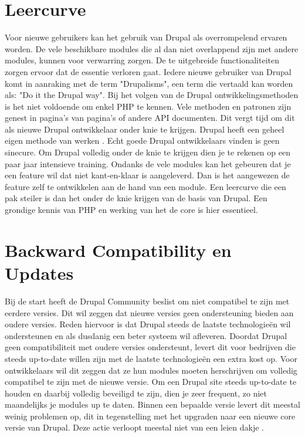 \label{ch:probleemstelling bij Drupal}

\section{Leercurve}
Voor nieuwe gebruikers kan het gebruik van Drupal als overrompelend ervaren worden. De vele beschikbare modules die al dan niet overlappend zijn met andere modules, kunnen voor verwarring zorgen. De te uitgebreide functionaliteiten zorgen ervoor dat de essentie verloren gaat. 
\newline\newline
Iedere nieuwe gebruiker van Drupal komt in aanraking met de term "Drupalisms", een term die vertaald kan worden als: "Do it the Drupal way". Bij het volgen van de Drupal ontwikkelingsmethoden is het niet voldoende om enkel PHP te kennen. Vele methoden en patronen zijn genest in pagina's van pagina's of andere API documenten. Dit vergt tijd om dit als nieuwe Drupal ontwikkelaar onder knie te krijgen. Drupal heeft een geheel eigen methode van werken \citep{MCDpartners2015DrupalLook}.
\newline\newline
Echt goede Drupal ontwikkelaars vinden is geen sinecure. Om Drupal volledig onder de knie te krijgen dien je te rekenen op een paar jaar intensieve training.
\newline\newline
Ondanks de vele modules kan het gebeuren dat je een feature wil dat niet kant-en-klaar is aangeleverd. Dan is het aangewezen de feature zelf te ontwikkelen aan de hand van een module. Een leercurve die een pak steiler is dan het onder de knie krijgen van de basis van Drupal. Een grondige kennis van PHP en werking van het de core is hier essentieel.

\section{Backward Compatibility en Updates}
Bij de start heeft de Drupal Community beslist om  niet compatibel te zijn met eerdere versies. Dit wil zeggen dat nieuwe versies geen ondersteuning bieden aan oudere versies. Reden hiervoor is dat Drupal steeds de laatste technologieën wil ondersteunen en als dusdanig een beter systeem wil afleveren. 
\newline\newline
Doordat Drupal geen compatibiliteit met oudere versies ondersteunt, levert dit voor bedrijven die steeds up-to-date willen zijn met de laatste technologieën een extra kost op. Voor ontwikkelaars wil dit zeggen dat ze hun modules moeten herschrijven om volledig compatibel te zijn met de nieuwe versie. 
\newline\newline
Om een Drupal site steeds up-to-date te houden en daarbij volledig beveiligd te zijn, dien je zeer frequent, zo niet maandelijks je modules up te daten. Binnen een bepaalde versie levert dit meestal weinig problemen op, dit in tegenstelling met het upgraden naar een nieuwe core versie van Drupal. Deze actie verloopt meestal niet van een leien dakje \citep{Tzu-ChiHuang2015StopFun}.

